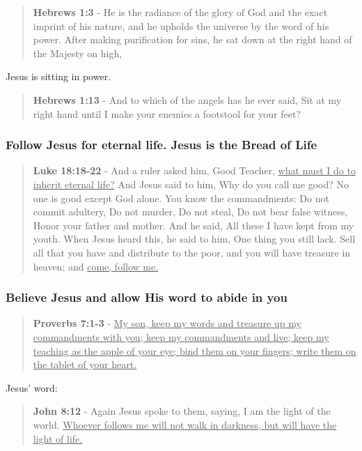 \documentclass[11pt]{article}
\begin{document}
\begin{quote}
\textbf{Hebrews 1:3} - He is the radiance of the glory of God and the exact imprint of his nature, and he upholds the universe by the word of his power. After making purification for sins, he sat down at the right hand of the Majesty on high,
\end{quote}

Jesus is sitting in power.

\begin{quote}
\textbf{Hebrews 1:13} - And to which of the angels has he ever said, Sit at my right hand until I make your enemies a footstool for your feet?
\end{quote}

\subsubsection{Follow Jesus for eternal life. Jesus is the Bread of Life}
\label{sec:org3ad29c8}
\begin{quote}
\textbf{Luke 18:18-22} - And a ruler asked him, Good Teacher, \uline{what must I do to inherit eternal life?} And Jesus said to him, Why do you call me good? No one is good except God alone. You know the commandments: Do not commit adultery, Do not murder, Do not steal, Do not bear false witness, Honor your father and mother. And he said, All these I have kept from my youth. When Jesus heard this, he said to him, One thing you still lack. Sell all that you have and distribute to the poor, and you will have treasure in heaven; and \uline{come, follow me.}
\end{quote}

\subsubsection{Believe Jesus and allow His word to abide in you}
\label{sec:org4683b8f}

\begin{quote}
\textbf{Proverbs 7:1-3} - \uline{My son, keep my words and treasure up my commandments with you; keep my commandments and live; keep my teaching as the apple of your eye; bind them on your fingers; write them on the tablet of your heart.}
\end{quote}

Jesus' word:

\begin{quote}
\textbf{John 8:12} - Again Jesus spoke to them, saying, I am the light of the world. \uline{Whoever follows me will not walk in darkness, but will have the light of life.}
\end{quote}
\end{document}
